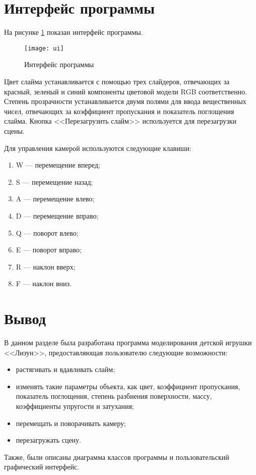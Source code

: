 \section{Интерфейс программы}

На рисунке \ref{ui} показан интерфейс программы.

\begin{figure}[h!]
	\centering
	\texttt{[image: ui]}
	\caption{Интерфейс программы}
	\label{ui}
\end{figure}

Цвет слайма устанавливается с помощью трех слайдеров, отвечающих за красный, зеленый и синий компоненты цветовой модели RGB соответственно. Степень прозрачности устанавливается двумя полями для ввода вещественных чисел, отвечающих за коэффициент пропускания и показатель поглощения слайма. Кнопка <<Перезагрузить слайм>> используется для перезагрузки сцены.

Для управления камерой используются следующие клавиши:

\begin{enumerate}
	\item W --- перемещение вперед;
	\item S --- перемещение назад;
	\item A --- перемещение влево;
	\item D --- перемещение вправо;
	\item Q --- поворот влево;
	\item E --- поворот вправо;
	\item R --- наклон вверх;
	\item F --- наклон вниз.
\end{enumerate}

\section*{Вывод}

В данном разделе была разработана программа моделирования детской игрушки <<Лизун>>, предоставляющая пользователю следующие возможности:

\begin{itemize}
	\item растягивать и вдавливать слайм;
	\item изменять такие параметры объекта, как цвет, коэффициент пропускания, показатель поглощения, степень разбиения поверхности, массу, коэффициенты упругости и затухания;
	\item перемещать и поворачивать камеру;
	\item перезагружать сцену.
\end{itemize}

Также, были описаны диаграмма классов программы и пользовательский графический интерфейс.

\clearpage
